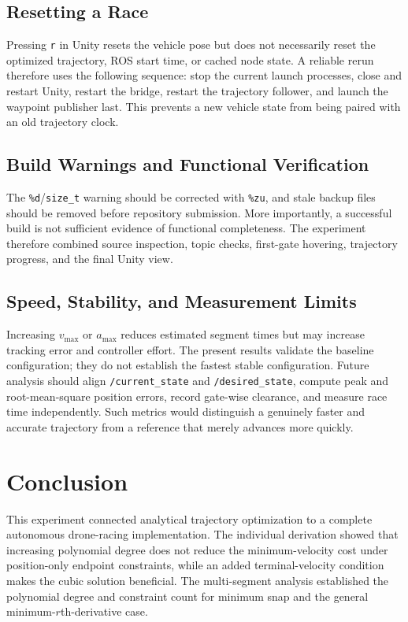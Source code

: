 \documentclass[letterpaper,10pt,conference]{IEEEtran}
\begin{document}
\subsection{Resetting a Race}
Pressing \texttt{r} in Unity resets the vehicle pose but does not necessarily reset the optimized trajectory, ROS start time, or cached node state. A reliable rerun therefore uses the following sequence: stop the current launch processes, close and restart Unity, restart the bridge, restart the trajectory follower, and launch the waypoint publisher last. This prevents a new vehicle state from being paired with an old trajectory clock.

\subsection{Build Warnings and Functional Verification}
The \texttt{\%d}/\texttt{size\_t} warning should be corrected with \texttt{\%zu}, and stale backup files should be removed before repository submission. More importantly, a successful build is not sufficient evidence of functional completeness. The experiment therefore combined source inspection, topic checks, first-gate hovering, trajectory progress, and the final Unity view.

\subsection{Speed, Stability, and Measurement Limits}
Increasing $v_{\max}$ or $a_{\max}$ reduces estimated segment times but may increase tracking error and controller effort. The present results validate the baseline configuration; they do not establish the fastest stable configuration. Future analysis should align \texttt{/current\_state} and \texttt{/desired\_state}, compute peak and root-mean-square position errors, record gate-wise clearance, and measure race time independently. Such metrics would distinguish a genuinely faster and accurate trajectory from a reference that merely advances more quickly.

\section{Conclusion}
This experiment connected analytical trajectory optimization to a complete autonomous drone-racing implementation. The individual derivation showed that increasing polynomial degree does not reduce the minimum-velocity cost under position-only endpoint constraints, while an added terminal-velocity condition makes the cubic solution beneficial. The multi-segment analysis established the polynomial degree and constraint count for minimum snap and the general minimum-$r$th-derivative case.
\end{document}
